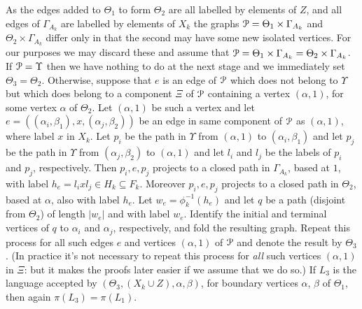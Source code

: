 \documentclass[a4paper,12pt]{article}
\renewcommand{\a}{\alpha }
\renewcommand{\b}{\beta }
\newcommand{\G}{\Gamma }
\newcommand{\T}{\Theta }
\newcommand{\U}{\Upsilon }
\newcommand{\cP}{{\cal{P}}}
\numberwithin{equation}{section}
\numberwithin{figure}{section}
\begin{document}
As the edges added to $\T_1$ to form $\T_2$ are all labelled by elements
of $Z$, and all edges of $\G_{A_k}$ are labelled by elements of $X_k$
the graphs $\cP=\T_1\times \G_{A_k}$ and $\T_2\times \G_{A_k}$ differ only
in that the second may have some new isolated vertices. For our purposes
we may discard these and assume that $\cP=\T_1\times \G_{A_k}=
 \T_2\times \G_{A_k}$. If $\cP=\U$ then we have nothing to do at the
next stage and we immediately set $\T_3=\T_2$. Otherwise, suppose
that $e$ is an edge of $\cP$ which does not belong to $\U$ but
which does belong to a component $\Xi$  of $\cP$ containing a
vertex $(\a,1)$, for some vertex $\a$ of $\T_2$. Let $(\a,1)$ be
such a vertex and let $e=((\a_i,\b_1), x, (\a_j,\b_2))$ be an edge
in same component of $\cP$ as $(\a,1)$,
 where label $x$ in $X_k$.
 Let $p_i$ be
the path in $\U$ from $(\a,1)$ to $(\a_i,\b_1)$ and let $p_j$ be
the path in $\U$ from  $(\a_j,\b_2)$ to $(\a,1)$ and
let $l_i$ and $l_j$ be the labels of $p_i$ and $p_j$, respectively. Then
$p_i,e,p_j$ projects to a closed path in $\G_{A_k}$, based at $1$, with
label $h_e=l_i x l_j \in H_k\subseteq F_k$. Moreover
$p_i,e,p_j$ projects to a closed path in $\T_2$, based at $\a$, also
with label $h_e$. Let
$w_e=\phi_k^{-1}(h_e)$ and let
$q$ be a path (disjoint from $\T_2$) of length
$|w_e|$ and with label $w_e$. Identify the initial and terminal
vertices of $q$ to $\a_i$ and $\a_j$, respectively, and fold the
resulting graph. Repeat this process for all such edges $e$ and
vertices $(\a,1)$ of $\cP$
and denote the result by $\T_3$.
(In practice it's not necessary to
repeat this process for {\em all} such vertices $(\a,1)$ in $\Xi$: but it
makes the proofs later easier if we assume that we do so.)
If
$L_3$ is the
language accepted by $(\T_3,(X_k\cup Z), \a,\b)$, for boundary
vertices $\a$, $\b$ of $\T_1$, then again $\pi(L_3)=\pi(L_1)$.
\end{document}
